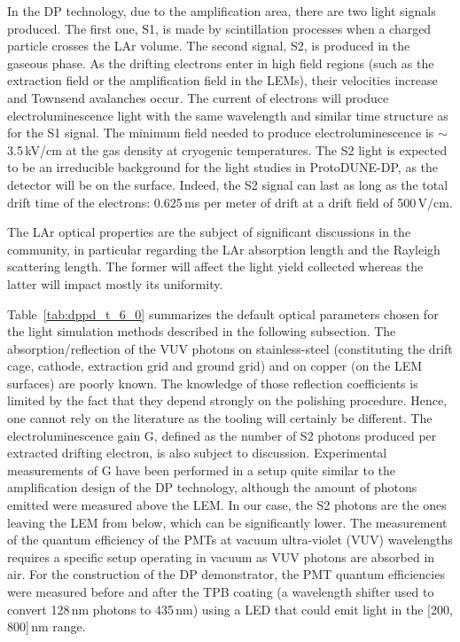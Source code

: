 In the DP technology, due to the amplification area, there are two light signals produced. The first one, S1, is made by scintillation processes when a charged particle crosses the LAr volume. The second signal, S2, is produced in the gaseous phase. As the drifting electrons enter in high field regions (such as the extraction field or the amplification field in the LEMs), their velocities increase and Townsend avalanches occur. The current of electrons will produce electroluminescence light with the same wavelength and similar time structure as for the S1 signal. The minimum field needed to produce electroluminescence is $\sim$3.5\,kV/cm at the gas density at cryogenic temperatures. The S2 light is expected to be an irreducible background for the light studies in ProtoDUNE-DP, as the detector will be on the surface. Indeed, the S2 signal can last as long as the total drift time of the electrons: 0.625\,ms per meter of drift at a drift field of 500\,V/cm.

The LAr optical properties are the subject of significant discussions in the community, in particular regarding the LAr absorption length and the Rayleigh scattering length. The former will affect the light yield collected whereas the latter will impact mostly its uniformity. 

Table~\ref{tab:dppd_t_6_0} summarizes the default optical parameters chosen for the light simulation methods described in the following subsection. The absorption/reflection of the VUV photons on stainless-steel (constituting the drift cage, cathode, extraction grid and ground grid) and on copper (on the LEM surfaces) are poorly known. The knowledge of those reflection coefficients is limited by the fact that they depend strongly on the polishing procedure. Hence, one cannot rely on the literature as the tooling will certainly be different. The electroluminescence gain G, defined as the number of S2 photons produced per extracted drifting electron, is also subject to discussion. Experimental measurements of G have been performed in a setup quite similar to the amplification design of the DP technology, although the amount of photons emitted were measured above the LEM. In our case, the S2 photons are the ones leaving the LEM from below, which can be significantly lower. The measurement of the quantum efficiency of the PMTs at vacuum ultra-violet (VUV) wavelengths requires a specific setup operating in vacuum as VUV photons are absorbed in air. For the construction of the DP demonstrator, the PMT quantum efficiencies were measured before and after the TPB coating (a wavelength shifter used to convert 128\,nm photons to 435\,nm) using a LED that could emit light in the [200, 800]\,nm range.

